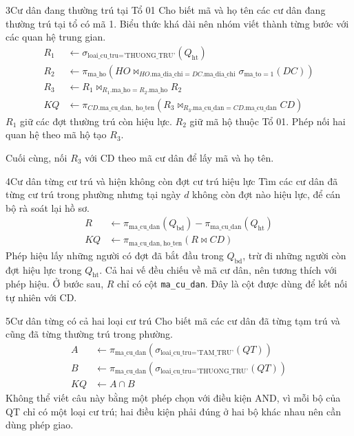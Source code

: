 \begin{racau}{3}{Cư dân đang thường trú tại Tổ 01}
Cho biết mã và họ tên các cư dân đang thường trú tại tổ có mã 1. Biểu thức khá dài nên nhóm viết thành từng bước với các quan hệ trung gian.
\begin{equation*}
\begin{aligned}
R_1 &\leftarrow \sigma_{\text{loai\_cu\_tru} = \text{'THUONG\_TRU'}}(Q_{\mathrm{ht}})\\
R_2 &\leftarrow \pi_{\text{ma\_ho}}\left(HO \bowtie_{HO.\text{ma\_dia\_chi} = DC.\text{ma\_dia\_chi}} \sigma_{\text{ma\_to} = 1}(DC)\right)\\
R_3 &\leftarrow R_1 \bowtie_{R_1.\text{ma\_ho} = R_2.\text{ma\_ho}} R_2\\
KQ &\leftarrow \pi_{CD.\text{ma\_cu\_dan},\ \text{ho\_ten}}\left(R_3 \bowtie_{R_3.\text{ma\_cu\_dan} = CD.\text{ma\_cu\_dan}} CD\right)
\end{aligned}
\end{equation*}
$R_1$ giữ các đợt thường trú còn hiệu lực. $R_2$ giữ mã hộ thuộc Tổ 01. Phép nối hai quan hệ theo mã hộ tạo $R_3$.

Cuối cùng, nối $R_3$ với CD theo mã cư dân để lấy mã và họ tên.
\end{racau}

\begin{racau}{4}{Cư dân từng cư trú và hiện không còn đợt cư trú hiệu lực}
Tìm các cư dân đã từng cư trú trong phường nhưng tại ngày $d$ không còn đợt nào hiệu lực, để cán bộ rà soát lại hồ sơ.
\begin{equation*}
\begin{aligned}
R &\leftarrow \pi_{\text{ma\_cu\_dan}}\left(Q_{\mathrm{bd}}\right) - \pi_{\text{ma\_cu\_dan}}(Q_{\mathrm{ht}})\\
KQ &\leftarrow \pi_{\text{ma\_cu\_dan},\ \text{ho\_ten}}(R \bowtie CD)
\end{aligned}
\end{equation*}
Phép hiệu lấy những người có đợt đã bắt đầu trong $Q_{\mathrm{bd}}$, trừ đi những người còn đợt hiệu lực trong $Q_{\mathrm{ht}}$. Cả hai vế đều chiếu về mã cư dân, nên tương thích với phép hiệu. Ở bước sau, $R$ chỉ có cột \texttt{ma\_cu\_dan}. Đây là cột được dùng để kết nối tự nhiên với CD.
\end{racau}

\begin{racau}{5}{Cư dân từng có cả hai loại cư trú}
Cho biết mã các cư dân đã từng tạm trú và cũng đã từng thường trú trong phường.
\begin{equation*}
\begin{aligned}
A &\leftarrow \pi_{\text{ma\_cu\_dan}}\left(\sigma_{\text{loai\_cu\_tru} = \text{'TAM\_TRU'}}(QT)\right)\\
B &\leftarrow \pi_{\text{ma\_cu\_dan}}\left(\sigma_{\text{loai\_cu\_tru} = \text{'THUONG\_TRU'}}(QT)\right)\\
KQ &\leftarrow A \cap B
\end{aligned}
\end{equation*}
Không thể viết câu này bằng một phép chọn với điều kiện AND, vì mỗi bộ của QT chỉ có một loại cư trú; hai điều kiện phải đúng ở hai bộ khác nhau nên cần dùng phép giao.
\end{racau}

